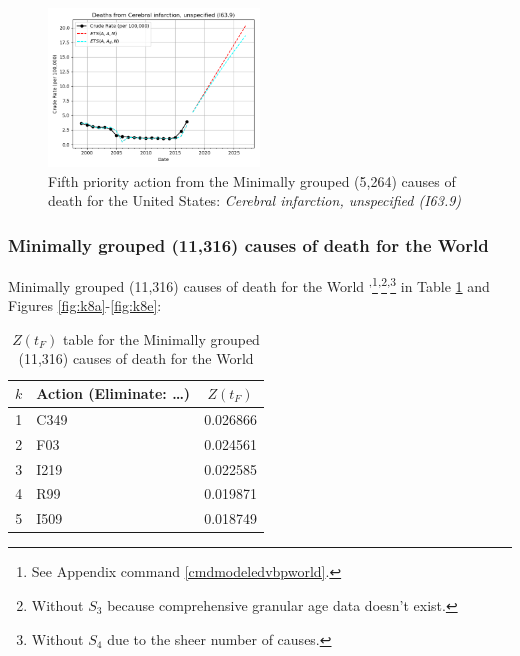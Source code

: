 \documentclass[10pt, a4paper, twocolumn]{IEEEconf}
\begin{document}
\begin{figure}[H]
  \centering
  \includegraphics[width=0.5\textwidth]{results/US_ICD10_MINIMALLY_GROUPED/Cerebral_infarction_unspecified_I63_9_ets.png}
  \caption{Fifth priority action from the Minimally grouped (5,264) causes of death for the United States: \textit{Cerebral infarction, unspecified (I63.9)}}\label{fig:k7e}
\end{figure}

\clearpage

\subsubsection{Minimally grouped (11,316) causes of death for the World}

Minimally grouped (11,316) causes of death for the World \citep{whomortality}\textsuperscript{,}\footnote{See Appendix command \ref{cmdmodeledvbpworld}.}\textsuperscript{,}\footnote{\label{no_s3}Without $S_3$ because comprehensive granular age data doesn't exist.}\textsuperscript{,}\footnote{Without $S_4$ due to the sheer number of causes.} in Table \ref{table:ztable8} and Figures \ref{fig:k8a}-\ref{fig:k8e}:

\begin{table}[H]
  \centering
  \begin{tabular}{clc}
    \toprule
      $k$ & Action (Eliminate: \ldots) & $Z(t_F)$ \\
    \midrule
      1 & C349 & 0.026866 \\
      2 &  F03 & 0.024561 \\
      3 & I219 & 0.022585 \\
      4 &  R99 & 0.019871 \\
      5 & I509 & 0.018749 \\
    \bottomrule
  \end{tabular}
  \caption{$Z(t_F)$ table for the Minimally grouped (11,316) causes of death for the World}
  \label{table:ztable8}
\end{table}
\end{document}
